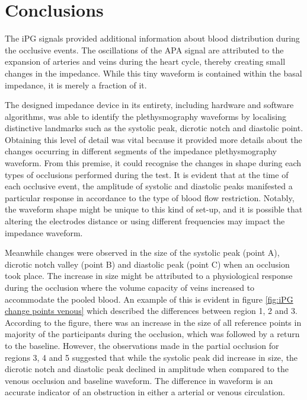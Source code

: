 \section{Conclusions}
\label{section apa 4}
The iPG signals provided additional information about blood distribution during the occlusive events. The oscillations of the APA signal are attributed to the expansion of arteries and veins during the heart cycle, thereby creating small changes in the impedance. While this tiny waveform is contained within the basal impedance, it is merely a fraction of it. 

The designed impedance device in its entirety, including hardware and software algorithms, was able to identify the plethysmography waveforms by localising distinctive landmarks such as the systolic peak, dicrotic notch and diastolic point. Obtaining this level of detail was vital because it provided more details about the changes occurring in different segments of the impedance plethysmography waveform. From this premise, it could recognise the changes in shape during each types of occlusions performed during the test.  It is evident that at the time of each occlusive event, the amplitude of systolic and diastolic peaks manifested a particular response in accordance to the type of blood flow restriction. Notably, the waveform shape might be unique to this kind of set-up, and it is possible that altering the electrodes distance or using different frequencies may impact the impedance waveform.

Meanwhile changes were observed in the size of the systolic peak (point A), dicrotic notch valley (point B) and diastolic peak (point C) when an occlusion took place. The increase in size might be attributed to a physiological response during the occlusion where the volume capacity of veins increased to accommodate the pooled blood. An example of this is evident in figure \ref{fig:iPG change points venous} which described the differences between region 1, 2 and 3. According to the figure, there was an increase in the size of all reference points in majority of the participants during the occlusion, which was followed by a return to the baseline. However, the observations made in the partial occlusion for regions 3, 4 and 5 suggested that while the systolic peak did increase in size, the dicrotic notch and diastolic peak declined in amplitude when compared to the venous occlusion and baseline waveform. The difference in waveform is an accurate indicator of an obstruction in either a arterial or venous circulation. 

